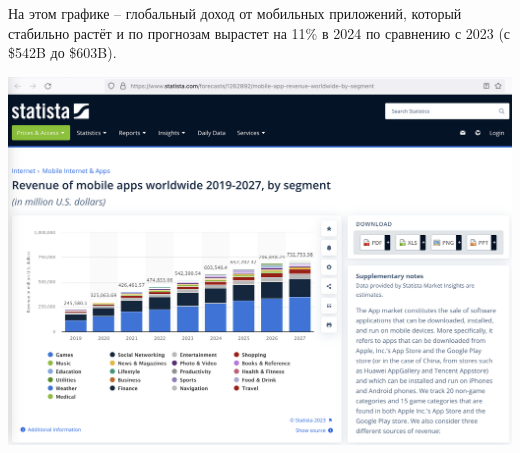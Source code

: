 
На этом графике -- глобальный доход от мобильных приложений,
который стабильно растёт и по прогнозам вырастет на 11\% в 2024 по сравнению с 2023 (с \$542B до \$603B).

\includegraphics[width=\textwidth]{apps-revenue}

\pagebreak
